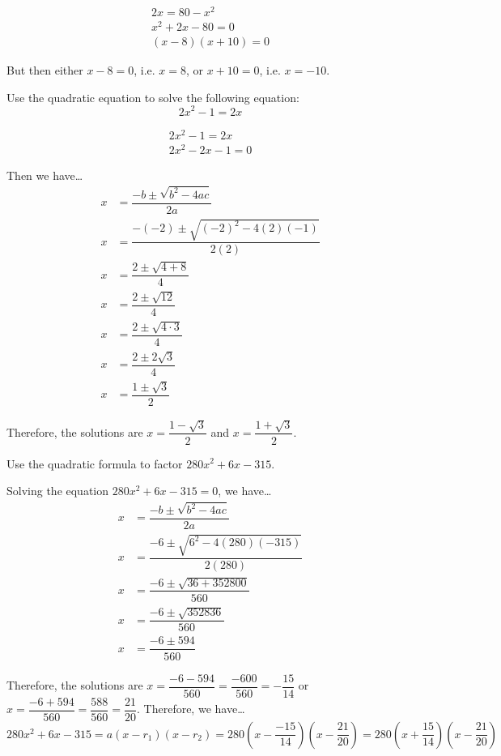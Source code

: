 \documentclass[11pt,letterpaper]{article}
\begin{document}
	\[
	\begin{aligned}
	2x= 80 - x^2 \\[0.3cm]
	x^2 + 2x - 80= 0 \\[0.3cm]
	(x - 8)(x + 10)= 0 
	\end{aligned}
	\] \pspace

But then either $x - 8=0$, i.e. $x= 8$, or $x + 10= 0$, i.e. $x= -10$. 



\newpage



 Use the quadratic equation to solve the following equation:
	\[
	2x^2 - 1= 2x
	\] \pspace

\sol
	\[
	\begin{aligned}
	2x^2 - 1= 2x \\[0.3cm]
	2x^2 - 2x - 1= 0 
	\end{aligned}
	\]

Then we have\dots
	\[
	\begin{aligned}
	x&= \dfrac{-b \pm \sqrt{b^2 - 4ac}}{2a} \\[0.3cm]
	x&= \dfrac{-(-2) \pm \sqrt{(-2)^2 - 4(2)(-1)}}{2(2)} \\[0.3cm]
	x&= \dfrac{2 \pm \sqrt{4 + 8}}{4} \\[0.3cm]
	x&= \dfrac{2 \pm \sqrt{12}}{4} \\[0.3cm]
	x&= \dfrac{2 \pm \sqrt{4 \cdot 3}}{4} \\[0.3cm]
	x&= \dfrac{2 \pm 2 \sqrt{3}}{4} \\[0.3cm]
	x&= \dfrac{1 \pm \sqrt{3}}{2}
	\end{aligned}
	\] \pspace

Therefore, the solutions are $x= \dfrac{1 - \sqrt{3}}{2}$ and $x= \dfrac{1 + \sqrt{3}}{2}$. 


\newpage



 Use the quadratic formula to factor $280x^2 + 6x - 315$. \pspace

\sol Solving the equation $280x^2 + 6x - 315= 0$, we have\dots
	\[
	\begin{aligned}
	x&= \dfrac{-b \pm \sqrt{b^2 - 4ac}}{2a} \\[0.3cm]
	x&= \dfrac{-6 \pm \sqrt{6^2 - 4(280)(-315)}}{2(280)} \\[0.3cm]
	x&= \dfrac{-6 \pm \sqrt{36 + 352800}}{560} \\[0.3cm]
	x&= \dfrac{-6 \pm \sqrt{352836}}{560} \\[0.3cm]
	x&= \dfrac{-6 \pm 594}{560}
	\end{aligned}
	\] \pspace

Therefore, the solutions are $x= \dfrac{-6 - 594}{560}= \dfrac{-600}{560}= -\dfrac{15}{14}$ or $x= \dfrac{-6 + 594}{560}= \dfrac{588}{560}= \dfrac{21}{20}$. Therefore, we have\dots
	\[
	280x^2 + 6x - 315= a(x - r_1)(x - r_2)= 280 \left(x - \dfrac{-15}{14} \right) \left(x - \dfrac{21}{20} \right)= 280 \left(x + \dfrac{15}{14} \right) \left(x - \dfrac{21}{20} \right)
	\]
\end{document}

